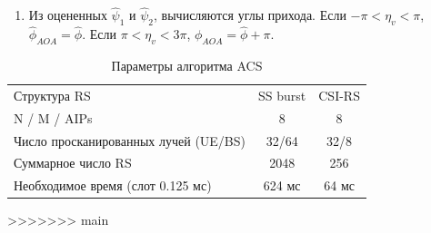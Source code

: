 \begin{enumerate}[label=\textbf{Шаг \arabic*:}]
\begin{equation}
\begin{pmatrix}
{                  1 & \exp{i\eta_3} & \exp{i2\eta_3} & \dots & \exp{i7\eta_3} \\
                  1 & \exp{i\eta_4} & \exp{i2\eta_4} & \dots & \exp{i7\eta_4} \\
                  }
              \end{pmatrix}^T
          \end{equation}.
          Обновляется $\eta_{v_2}$ и повторяется шаг 5 до тех пор, пока не будет
          достигнута необходимая точность. Получаем $\hat \psi_2 = (\eta_{v_2} + \pi)\mod(2\pi) - \pi$, где $(x \mod  y)$ -- остаток от деления $x$ на $y$.
    \item Из оцененных $\hat \psi_1$ и $\hat \psi_2$, вычисляются углы прихода. Если $-\pi < \eta_v < \pi$,
          $\hat \phi_{AOA} = \hat \phi$. Если $\pi < \eta_v < 3\pi$, $\phi_{AOA} = \hat \phi + \pi$.
\end{enumerate}
\begin{table}[h!]
    \centering
    \caption{Параметры алгоритма ACS}
    \begin{tabular}{lcc}
        \toprule
        \midrule
        Структура RS                         & SS burst & CSI-RS \\
        N / M / AIPs                         & 8        & 8      \\
        Число просканированных лучей (UE/BS) & 32/64    & 32/8   \\
        Суммарное число RS                   & 2048     & 256    \\
        Необходимое время (слот 0.125 мс)    & 624 мс   & 64 мс  \\
        \hline
    \end{tabular}
\end{table}
>>>>>>> main
